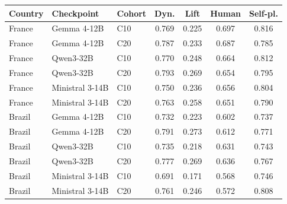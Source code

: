\begin{tabular}{lllcccc}
\toprule
Country & Checkpoint & Cohort & Dyn. & Lift & Human & Self-pl. \\
\midrule
France & Gemma 4-12B & C10 & 0.769 & 0.225 & 0.697 & 0.816 \\
France & Gemma 4-12B & C20 & 0.787 & 0.233 & 0.687 & 0.785 \\
France & Qwen3-32B & C10 & 0.770 & 0.248 & 0.664 & 0.812 \\
France & Qwen3-32B & C20 & 0.793 & 0.269 & 0.654 & 0.795 \\
France & Ministral 3-14B & C10 & 0.750 & 0.236 & 0.656 & 0.804 \\
France & Ministral 3-14B & C20 & 0.763 & 0.258 & 0.651 & 0.790 \\
Brazil & Gemma 4-12B & C10 & 0.732 & 0.223 & 0.602 & 0.737 \\
Brazil & Gemma 4-12B & C20 & 0.791 & 0.273 & 0.612 & 0.771 \\
Brazil & Qwen3-32B & C10 & 0.735 & 0.218 & 0.631 & 0.743 \\
Brazil & Qwen3-32B & C20 & 0.777 & 0.269 & 0.636 & 0.767 \\
Brazil & Ministral 3-14B & C10 & 0.691 & 0.171 & 0.568 & 0.746 \\
Brazil & Ministral 3-14B & C20 & 0.761 & 0.246 & 0.572 & 0.808 \\
\bottomrule
\end{tabular}
